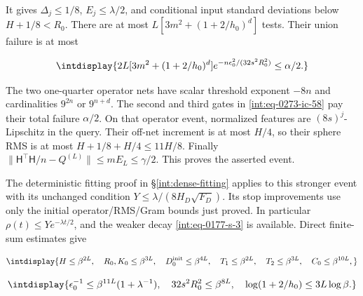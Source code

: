 
It gives \(\Delta_j\le1/8\), \(E_j\le\lambda/2\), and conditional input standard deviations below \(H+1/8<R_0\). There are at most \(L[3m^2+(1+2/h_0)^d]\) tests. Their union failure is at most


\begingroup\renewcommand{\theHequation}{intdisplay.652}
\begin{equation*}
\intdisplay{
2L[3m^2+(1+2/h_0)^d]
       e^{-n\epsilon_0^2/(32s^2R_0^2)}\le\alpha/2.
}
\end{equation*}
\endgroup


The two one-quarter operator nets have scalar threshold exponent \(-8n\) and cardinalities \(9^{2n}\) or \(9^{n+d}\). The second and third gates in \eqref{int:eq-0273-ic-58} pay their total failure \(\alpha/2\). On that operator event, normalized features are \((8s)^j\)-Lipschitz in the query. Their off-net increment is at most \(H/4\), so their sphere RMS is at most \(H+1/8+H/4\le11H/8\). Finally \(\|\mathsf H^\top\mathsf H/n-Q^{(L)}\|\le mE_L\le\gamma/2\). This proves the asserted event.



The deterministic fitting proof in \S\ref{int:dense-fitting} applies to this stronger event with its unchanged condition \(Y\le\lambda/(8H_D\sqrt{F_D})\). Its stop improvements use only the initial operator/RMS/Gram bounds just proved. In particular \(\rho(t)\le Ye^{-\lambda t/2}\), and the weaker decay \eqref{int:eq-0177-s-3} is available. Direct finite-sum estimates give


\begingroup\renewcommand{\theHequation}{intdisplay.653}
\begin{equation*}
\intdisplay{
H\le\beta^{2L},\quad R_0,K_0\le\beta^{3L},\quad
 D_0^{\rm init}\le\beta^{4L},\quad T_1\le\beta^{2L},\quad
 T_2\le\beta^{3L},\quad C_0\le\beta^{10L},
}
\end{equation*}
\endgroup

\begingroup\renewcommand{\theHequation}{intdisplay.654}
\begin{equation*}
\intdisplay{
\epsilon_0^{-1}\le\beta^{11L}(1+\lambda^{-1}),\quad
 32s^2R_0^2\le\beta^{8L},\quad
 \log(1+2/h_0)\le3L\log\beta.
}
\end{equation*}
\endgroup


